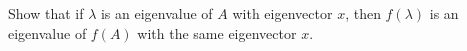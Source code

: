 \item[3.19] Show that if $\lambda$ is an eigenvalue of $A$ with eigenvector $x$, then $f(\lambda)$ is an eigenvalue of $f(A)$ with the same eigenvector $x$.
